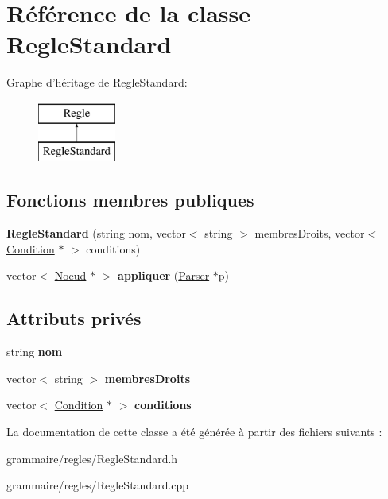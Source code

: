 \hypertarget{class_regle_standard}{\section{Référence de la classe Regle\-Standard}
\label{class_regle_standard}
}
Graphe d'héritage de Regle\-Standard\-:\begin{figure}[H]
\begin{center}
\leavevmode
\includegraphics[height=2.000000cm]{class_regle_standard}
\end{center}
\end{figure}
\subsection*{Fonctions membres publiques}
\begin{DoxyCompactItemize}
\item 
\hypertarget{class_regle_standard_a31ce3a86daa4053c28d0ce01a5e7987b}{{\bfseries Regle\-Standard} (string nom, vector$<$ string $>$ membres\-Droits, vector$<$ \hyperlink{class_condition}{Condition} $\ast$ $>$ conditions)}\label{class_regle_standard_a31ce3a86daa4053c28d0ce01a5e7987b}

\item 
\hypertarget{class_regle_standard_a1f7a35bb71c7ca8bcef317c5bb05bf05}{vector$<$ \hyperlink{class_noeud}{Noeud} $\ast$ $>$ {\bfseries appliquer} (\hyperlink{class_parser}{Parser} $\ast$p)}\label{class_regle_standard_a1f7a35bb71c7ca8bcef317c5bb05bf05}

\end{DoxyCompactItemize}
\subsection*{Attributs privés}
\begin{DoxyCompactItemize}
\item 
\hypertarget{class_regle_standard_a41918ffb7f2a22a292159d4ce93958e1}{string {\bfseries nom}}\label{class_regle_standard_a41918ffb7f2a22a292159d4ce93958e1}

\item 
\hypertarget{class_regle_standard_aaf9eca4d8e384a527cc164d0fea9be8a}{vector$<$ string $>$ {\bfseries membres\-Droits}}\label{class_regle_standard_aaf9eca4d8e384a527cc164d0fea9be8a}

\item 
\hypertarget{class_regle_standard_a9cdaa6a3143dfdfad1cfb3dc7363ce44}{vector$<$ \hyperlink{class_condition}{Condition} $\ast$ $>$ {\bfseries conditions}}\label{class_regle_standard_a9cdaa6a3143dfdfad1cfb3dc7363ce44}

\end{DoxyCompactItemize}


La documentation de cette classe a été générée à partir des fichiers suivants \-:\begin{DoxyCompactItemize}
\item 
grammaire/regles/Regle\-Standard.\-h\item 
grammaire/regles/Regle\-Standard.\-cpp\end{DoxyCompactItemize}
